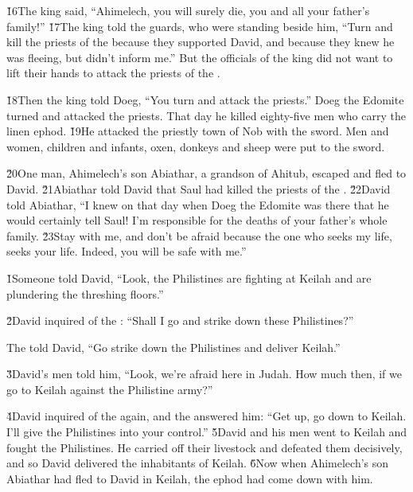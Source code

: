 \v{16}The king said, ``Ahimelech, you will surely die, you and all your father's family!'' \v{17}The king told the guards, who were standing beside him, ``Turn and kill the priests of the  because they supported David, and because they knew he was fleeing, but didn't inform me.'' But the officials of the king did not want to lift their hands to attack the priests of the .

\v{18}Then the king told Doeg, ``You turn and attack the priests.'' Doeg the Edomite turned and attacked the priests. That day he killed eighty-five men who carry the linen ephod. \v{19}He attacked the priestly town of Nob with the sword. Men and women, children and infants, oxen, donkeys and sheep were put to the sword.

\v{20}One man, Ahimelech's son Abiathar, a grandson of Ahitub, escaped and fled to David. \v{21}Abiathar told David that Saul had killed the priests of the . \v{22}David told Abiathar, ``I knew on that day when Doeg the Edomite was there that he would certainly tell Saul! I'm responsible for the deaths of your father's whole family. \v{23}Stay with me, and don't be afraid because the one who seeks my life, seeks your life. Indeed, you will be safe with me.''

\v{1}Someone told David, ``Look, the Philistines are fighting at Keilah and are plundering the threshing floors.''

\v{2}David inquired of the : ``Shall I go and strike down these Philistines?''

The  told David, ``Go strike down the Philistines and deliver Keilah.''

\v{3}David's men told him, ``Look, we're afraid here in Judah. How much then, if we go to Keilah against the Philistine army?''

\v{4}David inquired of the  again, and the  answered him: ``Get up, go down to Keilah. I'll give the Philistines into your control.'' \v{5}David and his men went to Keilah and fought the Philistines. He carried off their livestock and defeated them decisively, and so David delivered the inhabitants of Keilah. \v{6}Now when Ahimelech's son Abiathar had fled to David in Keilah, the ephod had come down with him.

